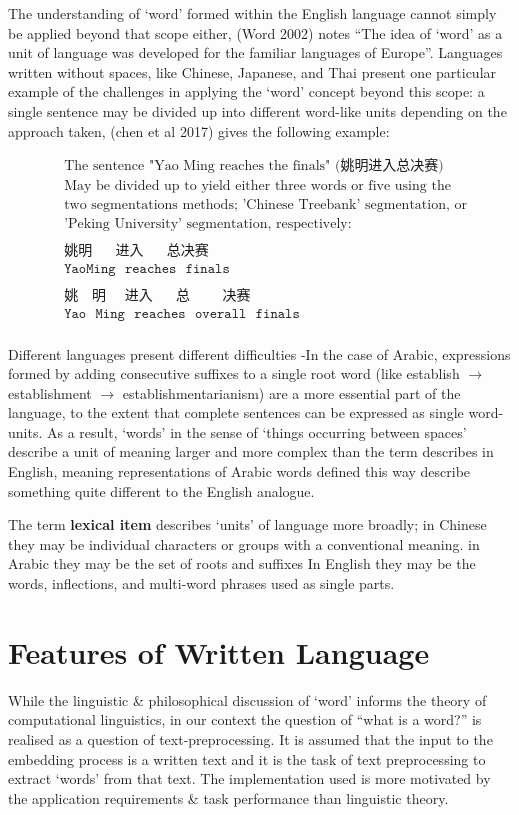 The understanding of `word' formed within the English language cannot simply be applied beyond that scope either, (Word 2002) notes ``The idea of ‘word’ as a unit of language was developed for the familiar languages of Europe''. Languages written without spaces, like Chinese, Japanese, and Thai present one particular example of the challenges in applying the `word' concept beyond this scope: a single sentence may be divided up into different word-like units depending on the approach taken, (chen et al 2017) gives the following example:

\begin{align*}
&\text{The sentence "Yao Ming reaches the finals" (姚明进入总决赛)}\\
  &\text{May be divided up to yield either three words or five using the }\\
  &\text{two segmentations methods; 'Chinese Treebank' segmentation, or}\\
  &\text{'Peking University' segmentation, respectively:}\\
\\
&\texttt{姚明~~~~~进入~~~~~总决赛~}\\
&\texttt{YaoMing~~reaches~~finals}\\
&\\
&\texttt{姚~~~明~~~~进入~~~~~总~~~~~~~决赛}\\
&\texttt{Yao~~Ming~~reaches~~overall~~finals}\\
\end{align*}

Different languages present different difficulties -In the case of Arabic, expressions formed by adding consecutive suffixes to a single root word (like establish $\to$ establishment $\to$ establishmentarianism) are a more essential part of the language, to the extent that complete sentences can be expressed as single word-units. As a result, `words' in the sense of `things occurring between spaces' describe a unit of meaning larger and more complex than the term describes in English, meaning representations of Arabic words defined this way describe something quite different to the English analogue.

The term \textbf{lexical item} describes `units' of language more broadly; in Chinese they may be individual characters or groups with a conventional meaning. in Arabic they may be the set of roots and suffixes In English they may be the words, inflections, and multi-word phrases used as single parts.

\section{Features of Written Language}
While the linguistic \& philosophical discussion of `word' informs the theory of computational linguistics, in our context the question of ``what is a word?'' is realised as a question of text-preprocessing. It is assumed that the input to the embedding process is a written text and it is the task of text preprocessing to extract `words' from that text. The implementation used is more motivated by the application requirements \& task performance than linguistic theory.

